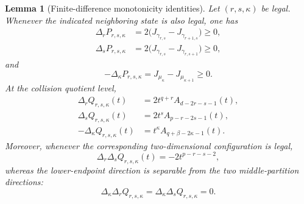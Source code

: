 \documentclass[11pt]{article}
\newtheorem{lemma}[theorem]{Lemma}
\theoremstyle{definition}
\begin{document}
\begin{lemma}[Finite-difference monotonicity identities]
\label{lem:finite-difference-monotonicity}
Let \((r,s,\kappa)\) be legal.
Whenever the indicated neighboring state is also legal, one has
\begin{align*}
\Delta_rP_{r,s,\kappa}
&=
2\bigl(J_{\gamma_{r,s}}-J_{\gamma_{r+1,s}}\bigr)
\ge0,\\
\Delta_sP_{r,s,\kappa}
&=
2\bigl(J_{\gamma_{r,s}}-J_{\gamma_{r,s+1}}\bigr)
\ge0,
\end{align*}
and
\begin{equation*}
-\Delta_\kappa P_{r,s,\kappa}
=
J_{\mu_\kappa}-J_{\mu_{\kappa+1}}
\ge0.
\end{equation*}
At the collision quotient level,
\begin{align*}
\Delta_rQ_{r,s,\kappa}(t)
&=
2t^{q+r}A_{d-2r-s-1}(t),\\
\Delta_sQ_{r,s,\kappa}(t)
&=
2t^sA_{p-r-2s-1}(t),\\
-\Delta_\kappa Q_{r,s,\kappa}(t)
&=
t^\kappa A_{q+\beta-2\kappa-1}(t).
\end{align*}
Moreover, whenever the corresponding two-dimensional configuration is legal,
\begin{equation*}
\Delta_r\Delta_sQ_{r,s,\kappa}(t)
=
-2t^{p-r-s-2},
\end{equation*}
whereas the lower-endpoint direction is separable from the two middle-partition directions:
\begin{equation*}
\Delta_\kappa\Delta_rQ_{r,s,\kappa}
=
\Delta_\kappa\Delta_sQ_{r,s,\kappa}
=
0.
\end{equation*}
\end{lemma}
\end{document}

